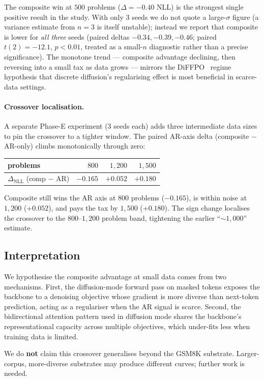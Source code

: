 The composite win at $500$ problems ($\Delta = -0.40$ NLL) is the
strongest single positive result in the study. With only $3$ seeds we
do not quote a large-$\sigma$ figure (a variance estimate from $n{=}3$
is itself unstable); instead we report that composite is lower for
\emph{all three} seeds (paired deltas $-0.34, -0.39, -0.46$; paired
$t(2) = -12.1$, $p < 0.01$, treated as a small-$n$ diagnostic rather
than a precise significance). The monotone
trend --- composite advantage declining, then reversing into a small
tax as data grows --- mirrors the DiFFPO~\citep{wei2025diffpo} regime
hypothesis that discrete diffusion's regularising effect is most
beneficial in scarce-data settings.

\paragraph{Crossover localisation.} A separate Phase-E experiment
($3$ seeds each) adds three intermediate data sizes to pin the
crossover to a tighter window. The paired AR-axis delta
(composite $-$ AR-only) climbs monotonically through zero:

\begin{center}
\begin{tabular}{lrrr}
\toprule
problems & $800$ & $1{,}200$ & $1{,}500$ \\
\midrule
$\Delta_\text{NLL}$ (comp $-$ AR) & $\mathbf{-0.165}$ & $+0.052$ & $+0.180$ \\
\bottomrule
\end{tabular}
\end{center}

\noindent Composite still wins the AR axis at $800$ problems
($-0.165$), is within noise at $1{,}200$ ($+0.052$), and pays the tax
by $1{,}500$ ($+0.180$). The sign change localises the crossover to
the $800$--$1{,}200$ problem band, tightening the earlier ``$\sim
1{,}000$'' estimate.

\subsection{Interpretation}

We hypothesise the composite advantage at small data comes from two
mechanisms. First, the diffusion-mode forward pass on masked tokens
exposes the backbone to a denoising objective whose gradient is more
diverse than next-token prediction, acting as a regulariser when the
AR signal is scarce. Second, the bidirectional attention pattern used
in diffusion mode shares the backbone's representational capacity
across multiple objectives, which under-fits less when training data
is limited.

We do \textbf{not} claim this crossover generalises beyond the
GSM8K substrate. Larger-corpus, more-diverse substrates may produce
different curves; further work is needed.
